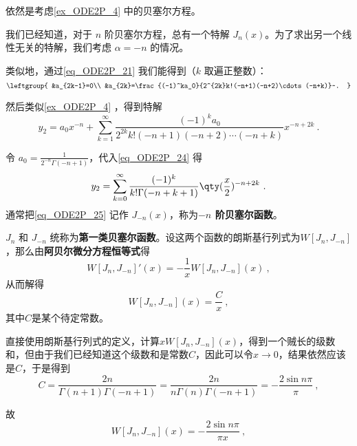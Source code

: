 \begin{example}{}\label{ex_ODE2P_5}
依然是考虑\autoref{ex_ODE2P_4} 中的贝塞尔方程。

我们已经知道，对于 $n$ 阶贝塞尔方程，总有一个特解 $J_n(x)$。为了求出另一个线性无关的特解，我们考虑 $\alpha=-n$ 的情况。

类似地，通过\autoref{eq_ODE2P_21} 我们能得到（$k$ 取遍正整数）：
\begin{equation}
\leftgroup{
    &a_{2k-1}=0\\
    &a_{2k}=\frac{(-1)^ka_0}{2^{2k}k!(-n+1)(-n+2)\cdots(-n+k)}~.
}
\end{equation}

然后类似\autoref{ex_ODE2P_4} ，得到特解
\begin{equation}\label{eq_ODE2P_24}
y_2=a_0x^{-n}+\sum\limits^\infty_{k=1}\frac{(-1)^ka_0}{2^{2k}k!(-n+1)(-n+2)\cdots(-n+k)}x^{-n+2k}~.
\end{equation}

令 $a_0=\frac{1}{2^{-n}\Gamma(-n+1)}$，代入\autoref{eq_ODE2P_24} 得
\begin{equation}\label{eq_ODE2P_25}
y_2=\sum\limits^\infty_{k=0}\frac{(-1)^k}{k!\Gamma(-n+k+1)}\qty(\frac{x}{2})^{-n+2k}~.
\end{equation}
通常把\autoref{eq_ODE2P_25} 记作 $J_{-n}(x)$，称为\textbf{$-n$ 阶贝塞尔函数}。



\end{example}

$J_n$ 和 $J_{-n}$ 统称为\textbf{第一类贝塞尔函数}。设这两个函数的朗斯基行列式为$W[J_n, J_{-n}]$，那么由\textbf{阿贝尔微分方程恒等式}得
\begin{equation}
W[J_n, J_{-n}]'(x)=-\frac{1}{x}W[J_n, J_{-n}](x)~,
\end{equation}
从而解得
\begin{equation}
W[J_n, J_{-n}](x) = \frac{C}{x}~,
\end{equation}
其中$C$是某个待定常数。

直接使用朗斯基行列式的定义，计算$xW[J_n, J_{-n}](x)$，得到一个贼长的级数和，但由于我们已经知道这个级数和是常数$C$，因此可以令$x\to 0$，结果依然应该是$C$，于是得到
\begin{equation}
C = \frac{2n}{\Gamma(n+1)\Gamma(-n+1)} = \frac{2n}{n\Gamma(n)\Gamma(-n+1)} = -\frac{2\sin n\pi}{\pi}~,
\end{equation}

故
\begin{equation}\label{eq_ODE2P_26}
W[J_n, J_{-n}](x) = -\frac{2\sin n\pi}{\pi x}~,
\end{equation}

